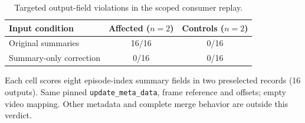 \begin{table}[t]
\centering
\footnotesize
\caption{Targeted output-field violations in the scoped consumer replay.}
\label{tab:consumer}
\renewcommand{\arraystretch}{1.13}
\setlength{\tabcolsep}{6pt}
\begin{tabular}{@{}lcc@{}}
\toprule
\textbf{Input condition} & \textbf{Affected ($n=2$)} & \textbf{Controls ($n=2$)} \\
\midrule
Original summaries & 16/16 & 0/16 \\
Summary-only correction & 0/16 & 0/16 \\
\bottomrule
\end{tabular}
\par\vspace{3pt}
\begin{minipage}{\columnwidth}\footnotesize
Each cell scores eight episode-index summary fields in two preselected records (16 outputs). Same pinned \texttt{update\_meta\_data}, frame reference and offsets; empty video mapping. Other metadata and complete merge behavior are outside this verdict.
\end{minipage}
\end{table}
